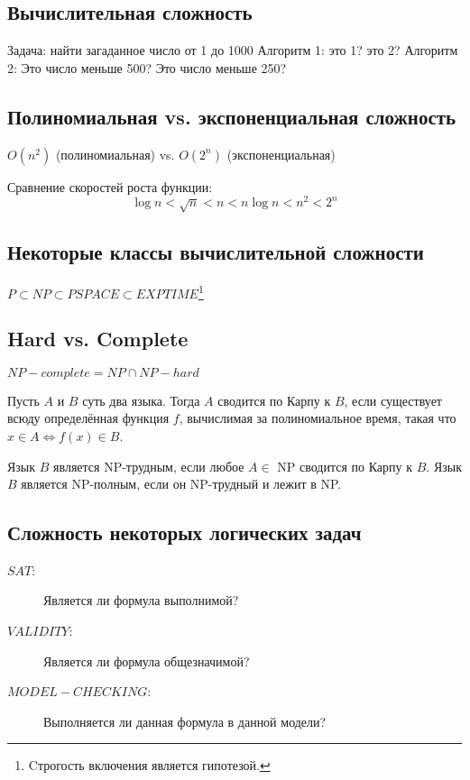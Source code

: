 \subsection{Вычислительная сложность}
Задача: найти загаданное число от 1 до 1000
Алгоритм 1: это 1? это 2?
Алгоритм 2: Это число меньше 500? Это число меньше 250?

\subsection{Полиномиальная vs. экспоненциальная сложность}
$O(n^2)$ (полиномиальная) vs. $O(2^n)$ (экспоненциальная)

Сравнение скоростей роста функции:
\begin{equation}
    \log  n < \sqrt{n} < n < n  \log  n < n^2 < 2^n
\end{equation}


\subsection{Некоторые классы вычислительной сложности}

\begin{center}
$P \subset NP \subset PSPACE \subset EXPTIME$\footnote{
Cтрогость включения  является гипотезой.}
\end{center}

\subsection{Hard vs. Complete}
$NP-complete =  NP \cap NP-hard$

Пусть $A$ и $B$ суть два языка. Тогда $A$ сводится по Карпу к $B$, если существует всюду определённая функция $f$, вычислимая за полиномиальное время, такая что $x\in A \Longleftrightarrow f(x) \in B$. 

Язык $B$ является NP-трудным, если любое $A \in$ NP сводится по Карпу к $B$. Язык $B$ является NP-полным, если он NP-трудный и лежит в NP.


\subsection{Сложность некоторых логических задач}

\begin{description}
\item[$SAT$:] Является ли формула выполнимой?
\item[$VALIDITY$:] Является ли формула общезначимой?
\item[$MODEL-CHECKING$:] Выполняется ли данная формула в данной модели?	
\end{description}


